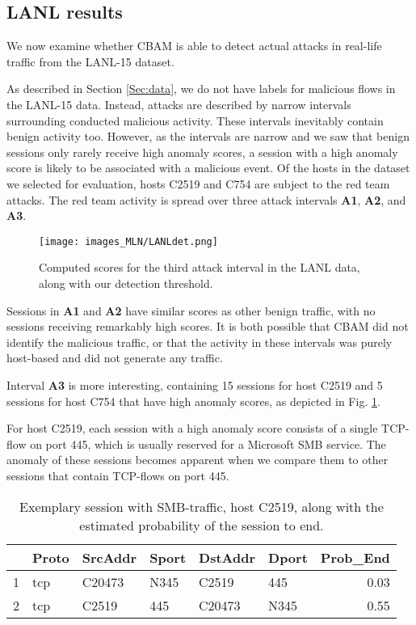 \subsection{LANL results}

We now examine whether CBAM is able to detect actual attacks in real-life traffic from the LANL-15 dataset.

As described in Section \ref{Sec:data}, we do not have labels for malicious flows in the LANL-15 data. Instead, attacks are described by narrow intervals surrounding conducted malicious activity. These intervals inevitably contain benign activity too. However, as the intervals are narrow and we saw that benign sessions only rarely receive high anomaly scores, a session with a high anomaly score is likely to be associated with a malicious event. Of the hosts in the dataset we selected for evaluation, hosts C2519 and C754 are subject to the red team attacks. The red team activity is spread over three attack intervals \textbf{A1}, \textbf{A2}, and \textbf{A3}. 

\begin{figure}[ht]
\centering
\texttt{[image: images\_MLN/LANLdet.png]} \caption{Computed scores for the third attack interval in the LANL data, along with our detection threshold.}\label{fig:LANLdetection}
\end{figure}

Sessions in \textbf{A1} and \textbf{A2} have similar scores as other benign traffic, with no sessions receiving remarkably high scores. It is both possible that CBAM did not identify the malicious traffic, or that the activity in these intervals was purely host-based and did not generate any traffic. 

Interval \textbf{A3} is more interesting, containing 15 sessions for host C2519 and 5 sessions for host C754 that have high anomaly scores, as depicted in Fig. \ref{fig:LANLdetection}.






For host C2519, each session with a high anomaly score consists of a single TCP-flow on port 445, which is usually reserved for a Microsoft SMB service. The anomaly of these sessions becomes apparent when we compare them to other sessions that contain TCP-flows on port 445. 

\begin{table}[ht]
\centering
\begin{tabular}{rlllllr}
  \hline
 & Proto & SrcAddr & Sport & DstAddr & Dport & Prob\_End \\ 
  \hline
1 & tcp & C20473 & N345 & C2519 & 445 & 0.03 \\ 
  2 & tcp & C2519 & 445 & C20473 & N345 & 0.55 \\ 
   \hline
\end{tabular}
\caption{Exemplary session with SMB-traffic,  host C2519, along with the estimated probability of the session to end.} 
\label{tab:MalSessionLANL}
\end{table}

